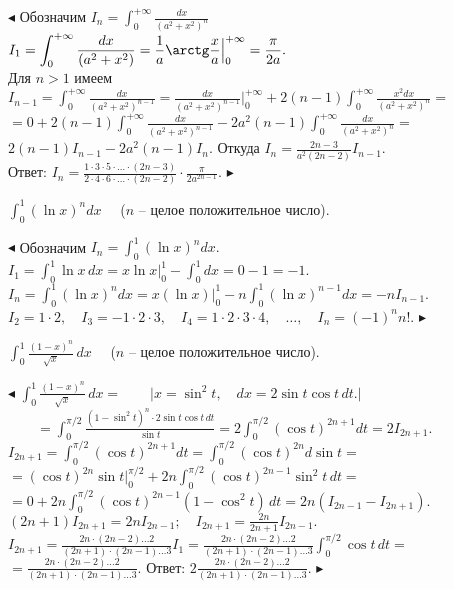\documentclass[a5paper,10pt]{article}
\begin{document}
\smallskip
\noindent $\blacktriangleleft$ Обозначим
$\displaystyle I_n=\int_{0}^{+\infty}\frac{dx}{(a^2+x^2)^n}$\\
$\displaystyle I_1=\int_{0}^{+\infty}\frac{dx}{(a^2+x^2)}=
\frac 1a\arctg\frac xa\Big|_{0}^{+\infty}=\frac{\pi}{2a}.$\\
Для $n>1$ имеем\\
$\displaystyle I_{n-1}=\int_{0}^{+\infty}\frac{dx}{(a^2+x^2)^{n-1}}=
\frac{dx}{(a^2+x^2)^{n-1}}\Big|_{0}^{+\infty}
+2(n-1)\int_{0}^{+\infty}\frac{x^2dx}{(a^2+x^2)^{n}}=$\\
$\displaystyle =0+2(n-1)\int_{0}^{+\infty}\frac{dx}{(a^2+x^2)^{n-1}}
-2a^2(n-1)\int_{0}^{+\infty}\frac{dx}{(a^2+x^2)^{n}}=$\\
$2(n-1)I_{n-1}-2a^2(n-1)I_n.$ Откуда $\displaystyle I_n=\frac{2n-3}{a^2(2n-2)}I_{n-1}.$\\
Ответ: $\displaystyle I_n=\frac{1\cdot3\cdot5\cdot\ldots\cdot(2n-3)}
{2\cdot4\cdot6\cdot\ldots\cdot(2n-2)}\cdot\frac{\pi}{2a^{2n-1}}.$ $\blacktriangleright$

\medskip
{} $\displaystyle \int_{0}^{1}(\ln x)^ndx\quad$ ($n$ -- целое
положительное число).

\smallskip
\noindent $\blacktriangleleft$ Обозначим
$\displaystyle I_n=\int_{0}^{1}(\ln x)^ndx.\quad$
$\displaystyle I_1=\int_{0}^{1}\ln x\,dx=x\ln x\Big|_{0}^{1}-\int_{0}^{1}dx=0-1=-1.$\\
$\displaystyle I_n=\int_{0}^{1}(\ln x)^ndx=x(\ln x)\Big|_{0}^{1}-n\int_{0}^{1}(\ln x)^{n-1}dx=-nI_{n-1}.$\\
$I_2=1\cdot2,\quad I_3=-1\cdot2\cdot3,\quad I_4=1\cdot2\cdot3\cdot4,\quad\ldots,\quad I_n=(-1)^nn!.$ $\blacktriangleright$

\medskip
{} $\displaystyle \int_0^1\frac{(1-x)^n}{\sqrt x}\,dx\quad$ ($n$ -- целое
положительное число).

\smallskip
\noindent $\blacktriangleleft$ $\displaystyle \int_0^1\frac{(1-x)^n}{\sqrt x}\,dx=\qquad\Big|x=\sin^2t,\quad dx=2\sin t\cos t\,dt.\Big|$\\
$\displaystyle \qquad=\int_0^{\pi/2}\frac{(1-\sin^2t)^n\cdot2\sin t\cos t\,dt}{\sin t}
=2\int_0^{\pi/2}(\cos t)^{2n+1}dt=2I_{2n+1}.$\\
$\displaystyle I_{2n+1}=\int_0^{\pi/2}(\cos t)^{2n+1}dt=\int_0^{\pi/2}(\cos t)^{2n}d\sin t=$\\
$\displaystyle =(\cos t)^{2n}\sin t\Big|_0^{\pi/2}+2n\int_0^{\pi/2}(\cos t)^{2n-1}\sin^2t\,dt=$\\
$\displaystyle =0+2n\int_0^{\pi/2}(\cos t)^{2n-1}(1-\cos^2t)\,dt=2n(I_{2n-1}-I_{2n+1}).$\\
$\displaystyle (2n+1)I_{2n+1}=2nI_{2n-1};\quad I_{2n+1}=\frac{2n}{2n+1}I_{2n-1}.$\\
$\displaystyle I_{2n+1}=\frac{2n\cdot(2n-2)\ldots2}{(2n+1)\cdot(2n-1)\ldots3}I_1=\frac{2n\cdot(2n-2)\ldots2}{(2n+1)\cdot(2n-1)\ldots3}\int_0^{\pi/2}\cos t\,dt=$\\
$\displaystyle =\frac{2n\cdot(2n-2)\ldots2}{(2n+1)\cdot(2n-1)\ldots3}.$\qquad
Ответ: $\displaystyle 2\frac{2n\cdot(2n-2)\ldots2}{(2n+1)\cdot(2n-1)\ldots3}$. $\blacktriangleright$
\end{document}
